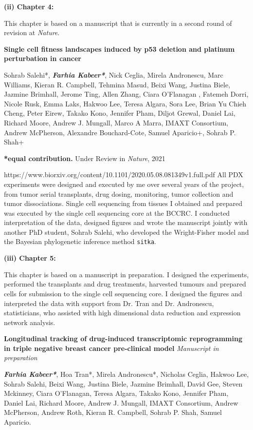 
  \textbf{(ii) Chapter 4:}

This chapter is based on a manuscript that is currently in a second
round of revision at \textit{Nature}.


 \textbf{Single  cell  fitness  landscapes  induced  by  p53  deletion and platinum perturbation in cancer}

Sohrab Salehi*, \emph{\textbf{Farhia Kabeer*}}, Nick Ceglia, Mirela Andronescu, Marc Williams, Kieran R. Campbell, Tehmina Masud, Beixi Wang, Justina Biele, Jazmine Brimhall, Jerome Ting, Allen Zhang, Ciara O'Flanagan , Fatemeh Dorri, Nicole Rusk, Emma Laks, Hakwoo Lee, Teresa Algara, Sora Lee, Brian Yu Chieh Cheng, Peter Eirew, Takako Kono, Jennifer Pham, Diljot Grewal, Daniel Lai, Richard Moore, Andrew J. Mungall, Marco A Marra, IMAXT Consortium, Andrew McPherson, Alexandre Bouchard-Cote, Samuel Aparicio+, Sohrab P. Shah+

 \textbf{*equal contribution.} Under Review in \textit{Nature}, 2021

https://www.biorxiv.org/content/10.1101/2020.05.08.081349v1.full.pdf
 All PDX experiments were designed and executed by me over several years of the project, from tumor serial transplants, drug dosing, monitoring, tumor collection and tumor dissociations. Single cell sequencing from tissues I obtained and prepared was executed by the single cell sequencing core at the BCCRC. I conducted interpretation of the data, designed figures and wrote the manuscript jointly with another PhD student, Sohrab Salehi, who developed the Wright-Fisher model and the Bayesian phylogenetic inference method \texttt{sitka}.  


  \textbf{(iii) Chapter 5:}
   
This chapter is based on a manuscript in preparation. I designed the experiments, performed the transplants and drug treatments, harvested tumours and prepared cells for submission to the single cell sequencing core. I designed the figures and interpreted the data with support from Dr. Tran and Dr. Andronescu, statisticians, who assisted with high dimensional data reduction and expression network analysis.
  
\textbf{Longitudinal tracking of drug-induced transcriptomic reprogramming in triple negative breast cancer pre-clinical model} \textit{Manuscript in preparation}

\emph{\textbf{Farhia Kabeer*}}, Hoa Tran*, Mirela Andronescu*,   
Nicholas Ceglia, Hakwoo Lee, Sohrab Salehi, Beixi Wang, Justina Biele, Jazmine Brimhall, David Gee, Steven Mckinney, Ciara O'Flanagan, Teresa Algara, Takako Kono, Jennifer Pham, Daniel Lai, Richard Moore, Andrew J. Mungall, IMAXT Consortium,  Andrew  McPherson, Andrew Roth, Kieran R. Campbell, Sohrab P. Shah, Samuel Aparicio.